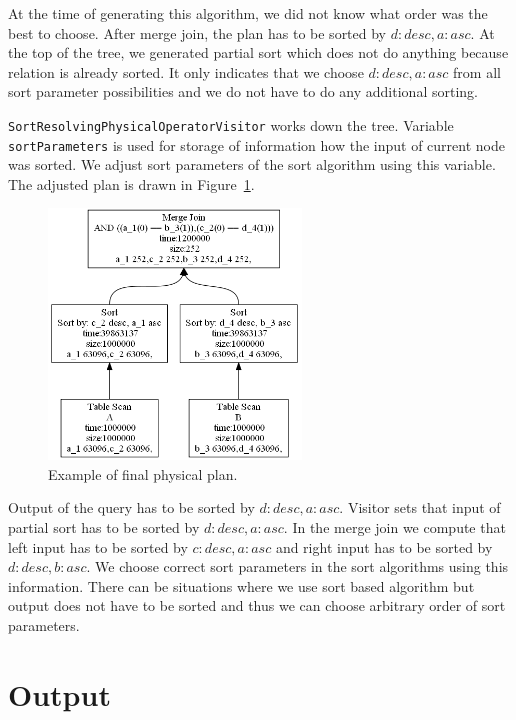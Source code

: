 At the time of generating this algorithm, we did not know what order was the best to choose. After merge join, the plan has to be sorted by $d:desc,a:asc$. At the top of the tree, we generated partial sort which does not do anything because relation is already sorted. It only indicates that we choose $d:desc,a:asc$ from all sort parameter possibilities and we do not have to do any additional sorting.

\texttt{SortResolvingPhysicalOperatorVisitor} works down the tree. Variable \texttt{sortParameters} is used for storage of information how the input of current node was sorted. We adjust sort parameters of the sort algorithm using this variable. The adjusted plan is drawn in Figure~\ref{fig:plansortresolved}.

\begin{figure}[h!]
  \centering
    \includegraphics[width=0.6\textwidth]{plansortresolved}

      \caption{Example of final physical plan.}
          \label{fig:plansortresolved}
\end{figure}

Output of the query has to be sorted by $d:desc,a:asc$. Visitor sets that input of partial sort has to be sorted by $d:desc,a:asc$. In the merge join we compute that left input has to be sorted by $c:desc,a:asc$ and right input has to be sorted by $d:desc,b:asc$. We choose correct sort parameters in the sort algorithms using this information. 
There can be situations where we use sort based algorithm but output does not have to be sorted and thus we can choose arbitrary order of sort parameters. 


\section{Output}

